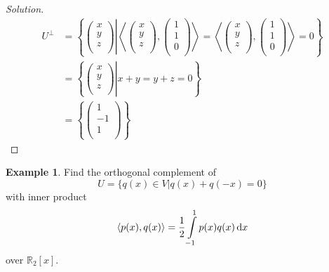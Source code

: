 \documentclass[fleqn, a4paper, 12pt]{article}
\theoremstyle{definition}
\newtheorem{example}{Example}
\theoremstyle{theorem}
\newenvironment{solution}
{\begin{proof}[Solution]\let\qed\relax}
	{\end{proof}}
\begin{document}
\begin{solution}
	\begin{align*}
		U^{\perp} &=
			\left\{
				\left.
				\begin{pmatrix}
					x\\
					y\\
					z\\
				\end{pmatrix}
				\right|
				\left\langle
					\begin{pmatrix}
						x\\
						y\\
						z\\
					\end{pmatrix}
					,
					\begin{pmatrix}
						1\\
						1\\
						0\\
					\end{pmatrix}
				\right\rangle
				=
				\left\langle
					\begin{pmatrix}
						x\\
						y\\
						z\\
					\end{pmatrix}
					,
					\begin{pmatrix}
						1\\
						1\\
						0\\
					\end{pmatrix}
				\right\rangle
				=
				0
			\right\}\\
		&= 
			\left\{
				\left.
				\begin{pmatrix}
					x\\
					y\\
					z\\
				\end{pmatrix}
				\right|
				x + y = y + z = 0
			\right\}\\
		&= 
			\left\{
				\begin{pmatrix}
					1\\
					-1\\
					1\\
				\end{pmatrix}
			\right\}
	\end{align*}
\end{solution}

\begin{example}
	Find the orthogonal complement of 
	\begin{equation*}
		U = \{q(x) \in V | q(x) + q(-x) = 0\}
	\end{equation*}
	with inner product
	\begin{equation*}
	\langle p(x), q(x) \rangle = \dfrac{1}{2} \int\limits_{-1}^{1} p(x) q(x) \dif x
	\end{equation*}
	over $\mathbb{R}_2[x]$.
\end{example}
\end{document}
